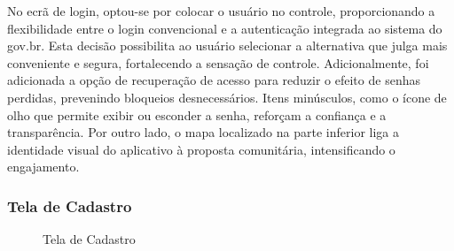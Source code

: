 \documentclass[a4paper, 12pt]{article}
\begin{document}
No ecrã de login, optou-se por colocar o usuário no controle, proporcionando a flexibilidade entre o login convencional e a autenticação integrada ao sistema do gov.br.  Esta decisão possibilita ao usuário selecionar a alternativa que julga mais conveniente e segura, fortalecendo a sensação de controle.  Adicionalmente, foi adicionada a opção de recuperação de acesso para reduzir o efeito de senhas perdidas, prevenindo bloqueios desnecessários.  Itens minúsculos, como o ícone de olho que permite exibir ou esconder a senha, reforçam a confiança e a transparência. Por outro lado, o mapa localizado na parte inferior liga a identidade visual do aplicativo à proposta comunitária, intensificando o engajamento.

\subsubsection{Tela de Cadastro}

\begin{figure}[H]
  \centering
  \caption{Tela de Cadastro}
  \label{fig:cadastro}
\end{figure}
\end{document}
